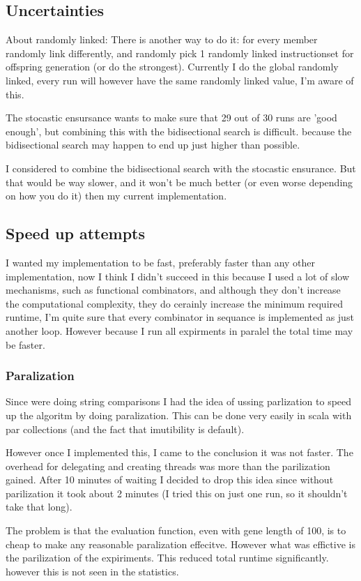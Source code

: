 \documentclass{article}
\begin{document}
\begin{empfile}
\subsection{Uncertainties}
About randomly linked:
	There is another way to do it: for every member randomly link
	differently, and randomly pick 1 randomly linked instructionset
	for offspring generation (or do the strongest).
	Currently I do the global randomly linked, every run will however
	have the same randomly linked value, I'm aware of this.

The stocastic ensursance wants to make sure that 29 out of 30 runs are
'good enough', but combining this with the bidisectional search is difficult.
because the bidisectional search may happen to end up just higher than possible.

I considered to combine the bidisectional search with the stocastic ensurance.
But that would be way slower, and it won't be much better (or even worse depending
on how you do it) then my current implementation.


\subsection{Speed up attempts}
I wanted my implementation to be fast, preferably faster than any other
implementation, now I think I didn't succeed in this because I used a
lot of slow mechanisms, such as functional combinators, and although
they don't increase the computational complexity, they do cerainly increase
the minimum required runtime, I'm quite sure that every combinator in sequance
is implemented as just another loop. However because I
run all expirments in paralel the total time may be faster.
\subsubsection{Paralization}
Since were doing string comparisons I had the idea of ussing parlization to
speed up the algoritm by doing paralization. This can be done very easily
in scala with par collections (and the fact that imutibility is default).

However once I implemented this, I came to the conclusion it was not faster.
The overhead for delegating and creating threads was more than the parilization
gained.  After 10 minutes of waiting I decided to drop this idea 
since without parilization it took about 2 minutes (I tried this
on just one run, so it shouldn't take that long).

The problem is that the evaluation function, even with gene length of 100, is
to cheap to make any reasonable paralization effecitve. However what was effictive
is the parilization of the expiriments. This reduced total runtime 
significantly. however this is not seen in the statistics.


\end{empfile}
\end{document}
